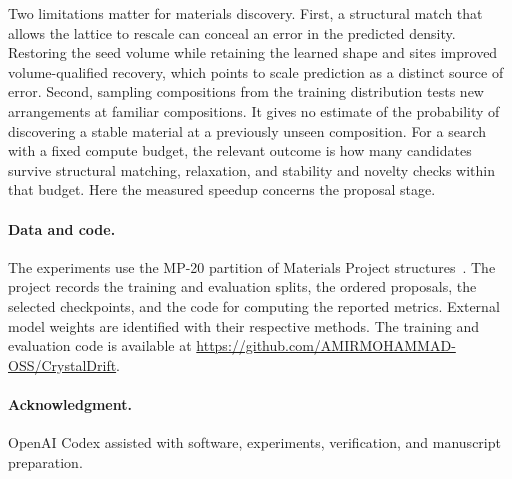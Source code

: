 Two limitations matter for materials discovery. First, a structural match that allows the lattice to rescale can conceal an error in the predicted density. Restoring the seed volume while retaining the learned shape and sites improved volume-qualified recovery, which points to scale prediction as a distinct source of error. Second, sampling compositions from the training distribution tests new arrangements at familiar compositions. It gives no estimate of the probability of discovering a stable material at a previously unseen composition. For a search with a fixed compute budget, the relevant outcome is how many candidates survive structural matching, relaxation, and stability and novelty checks within that budget. Here the measured speedup concerns the proposal stage.

\paragraph{Data and code.}
The experiments use the MP-20 partition of Materials Project structures~\cite{materialsproject,cdvae}. The project records the training and evaluation splits, the ordered proposals, the selected checkpoints, and the code for computing the reported metrics. External model weights are identified with their respective methods. The training and evaluation code is available at \url{https://github.com/AMIRMOHAMMAD-OSS/CrystalDrift}.

\paragraph{Acknowledgment.}
OpenAI Codex assisted with software, experiments, verification, and manuscript preparation.
